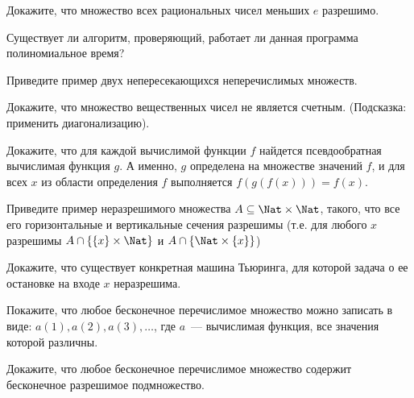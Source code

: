 \setcounter{curtask}{7}


\begin{task}
    Докажите, что множество всех рациональных чисел меньших $e$ разрешимо.
\end{task}

\begin{task}
    Существует ли алгоритм, проверяющий, работает ли данная программа
    полиномиальное время?
\end{task}

\begin{task}
    Приведите пример двух непересекающихся неперечислимых множеств.
\end{task}

\begin{task}
    Докажите, что множество вещественных чисел не является счетным.
    (Подсказка: применить диагонализацию).
\end{task}

\begin{task}
    Докажите, что для каждой вычислимой функции $f$ найдется
    псевдообратная вычислимая функция $g$. А именно, $g$ определена на
    множестве значений $f$, и для всех $x$ из области определения $f$
    выполняется $f(g(f(x))) = f(x)$.
\end{task}

\begin{task}
    Приведите пример неразрешимого множества $A \subseteq \Nat \times \Nat$,
    такого, что все его горизонтальные и вертикальные сечения
    разрешимы (т.е. для любого $x$ разрешимы $A \cap \{\{x\} \times \Nat\}$
    и $A \cap \{\Nat \times \{x\}\}$)
\end{task}

\begin{task}
    Докажите, что существует конкретная машина Тьюринга, для которой
    задача о ее остановке на входе $x$ неразрешима.
\end{task}
\breakline

\begin{ptask}{4}
    Покажите, что любое бесконечное перечислимое множество можно
    записать в виде: ${a(1), a(2), a(3), \dots}$, где $a$~---
    вычислимая функция, все значения которой различны.
\end{ptask}

\begin{ptask}{5}
    Докажите, что любое бесконечное перечислимое множество содержит
    бесконечное разрешимое подмножество.
\end{ptask}